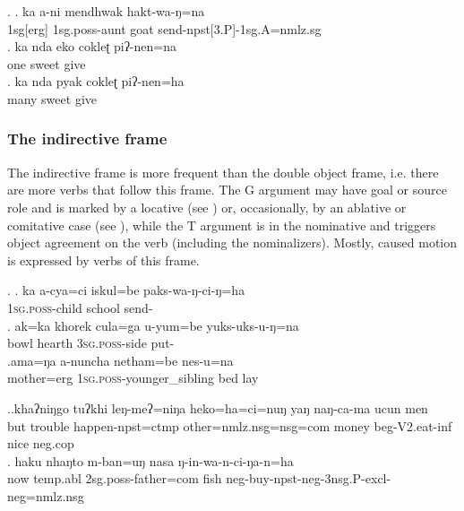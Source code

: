\ex. \ag. ka  a-ni mendhwak hakt-wa-ŋ=na\\
{\sc 1sg[erg]} {\sc 1sg.poss}-aunt goat send{\sc -npst[3.P]-1sg.A=nmlz.sg}\\
\bg. ka nda eko cokleʈ piʔ-nen=na\\
		  one sweet give\\
	\bg. ka nda pyak cokleʈ piʔ-nen=ha\\
	  many sweet give\\

\subsubsection{The indirective frame}


\noindent
The indirective frame is more frequent than the double object frame, i.e. there are more verbs that follow this frame. The G argument may have goal or source role and is marked by a locative (see \Next) or, occasionally, by an ablative or comitative case (see \NNext), while the T argument is in the nominative and triggers object agreement on the verb (including the nominalizers). Mostly, caused motion is  expressed by verbs of this frame. 

\ex. \ag. ka a-cya=ci iskul=be paks-wa-ŋ-ci-ŋ=ha \\
		 \textsc{1sg.poss}-child school send-	\\
		\bg. ak=ka khorek cula=ga u-yum=be yuks-uks-u-ŋ=na\\
	 bowl hearth \textsc{3sg.poss}-side put-	\\
\bg.ama=ŋa a-nuncha netham=be nes-u=na\\
mother{\sc =erg} \textsc{1sg.poss}-younger\_sibling  bed lay	\\
	
 
\ex.\ag.khaʔniŋgo tuʔkhi leŋ-meʔ=niŋa                heko=ha=ci=nuŋ               yaŋ  naŋ-ca-ma        ucun men\\
but        trouble happen{\sc [3sg]-npst=ctmp} other{\sc=nmlz.nsg=nsg=com}  money beg{\sc-V2.eat-inf } nice {\sc neg.cop}\\
 
		\bg. haku nhaŋto    m-ban=uŋ                nasa ŋ-in-wa-n-ci-ŋa-n=ha\\
		now {\sc temp.abl} {\sc 2sg.poss-}father{\sc =com} fish {\sc neg-}buy{\sc -npst-neg-3nsg.P-excl-neg=nmlz.nsg}\\
		 

